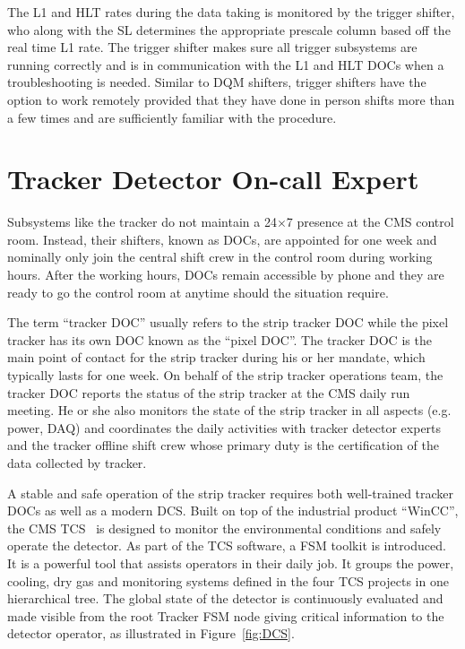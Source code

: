 The \ac{L1} and \ac{HLT} rates during the data taking is monitored by the trigger shifter, who along with the \ac{SL} determines the appropriate prescale column based off the real time \ac{L1} rate. The trigger shifter makes sure all trigger subsystems are running correctly and is in communication with the \ac{L1} and \ac{HLT} \acp{DOC} when a troubleshooting is needed. Similar to \ac{DQM} shifters, trigger shifters have the option to work remotely provided that they have done in person shifts more than a few times and are sufficiently familiar with the procedure. 

\section{Tracker Detector On-call Expert}
\label{sec:DOC}

Subsystems like the tracker do not maintain a 24$\times$7 presence at the \ac{CMS} control room. Instead, their shifters, known as \acp{DOC}, are appointed for one week and nominally only join the central shift crew in the control room during working hours. After the working hours, \acp{DOC} remain accessible by phone and they are ready to go the control room at anytime should the situation require. 

The term ``tracker \ac{DOC}'' usually refers to the strip tracker \ac{DOC} while the pixel tracker has its own \ac{DOC} known as the ``pixel \ac{DOC}''. The tracker \ac{DOC} is the main point of contact for the strip tracker during his or her mandate, which typically lasts for one week. On behalf of the strip tracker operations team, the tracker \ac{DOC} reports the status of the strip tracker at the \ac{CMS} daily run meeting. He or she also monitors the state of the strip tracker in all aspects (e.g. power, \ac{DAQ}) and coordinates the daily activities with tracker detector experts and the tracker offline shift crew whose primary duty is the certification of the data collected by tracker. 

A stable and safe operation of the strip tracker requires both well-trained tracker \acp{DOC} as well as a modern \ac{DCS}. Built on top of the industrial product “WinCC”, the \ac{CMS} \ac{TCS}~\cite{Shah:2009zz,Karimeh:2020tzx} is designed to monitor the environmental conditions and safely operate the detector. As part of the \ac{TCS} software, a \ac{FSM} toolkit is introduced. It is a powerful tool that assists operators in their daily job. It groups the power, cooling, dry gas and monitoring systems defined in the four \ac{TCS} projects in one hierarchical tree. The global state of the detector is continuously evaluated and made visible from the root Tracker \ac{FSM} node giving critical information to the detector operator, as illustrated in Figure~\ref{fig:DCS}.

